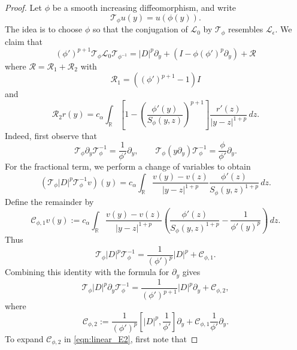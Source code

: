 \documentclass[11pt]{amsart}
\theoremstyle{definition}
\theoremstyle{remark}
\numberwithin{equation}{section}
\newcommand{\R}{\mathbb{R}}
\newcommand{\mc}[1]{\mathcal{#1}}
\begin{document}
\begin{proof}
    Let $\phi$ be a smooth increasing diffeomorphism, and write
    \[
        \mc{T}_\phi u(y)=u(\phi(y)).
    \]
    The idea is to choose $\phi$ so that the conjugation of $\mc{L}_0$ by $\mc{T}_\phi$ resembles $\mc{L}_\epsilon$. We claim that 
    \begin{equation}\label{eqn:linear_conjugation}
        (\phi')^{p + 1}\mc{T}_\phi \mc{L}_0 \mc{T}_{\phi^{-1}} = |D|^p \partial_y + \left(I - \phi(\phi')^p\partial_y\right) + \mc{R}
    \end{equation}
    where $\mc{R} = \mc{R}_1 + \mc{R}_2$ with 
    \begin{equation}\label{eqn:linear_R1}
        \mc{R}_1 = \left((\phi')^{p + 1} - 1\right)I
    \end{equation}
    and
    \begin{equation}\label{eqn:linear_R2}
        \mc{R}_2r(y) = c_\alpha\int_{\R}
        \left[1-\left(\frac{\phi'(y)}{S_\phi(y,z)}\right)^{p+1}\right]
        \frac{r'(z)}{|y-z|^{1+p}}\,dz.
    \end{equation}
    Indeed, first observe that
    \[
        \mc{T}_\phi\partial_y\mc{T}_\phi^{-1}
        = \frac{1}{\phi'}\partial_y,
        \qquad
        \mc{T}_\phi(y\partial_y)\mc{T}_\phi^{-1}
        =\frac{\phi}{\phi'}\partial_y.
    \]
    For the fractional term, we perform a change of variables to obtain
    \[
        (\mc{T}_\phi|D|^p\mc{T}_\phi^{-1}v)(y)
        =c_\alpha\int_{\R}\frac{v(y)-v(z)}{|y-z|^{1+p}}
        \frac{\phi'(z)}{S_\phi(y,z)^{1+p}}\,dz.
    \]
    Define the remainder by
    \begin{equation}\label{eqn:linear_E1}
        \mc{C}_{\phi,1}v(y)
        :=c_\alpha\int_{\R}\frac{v(y)-v(z)}{|y-z|^{1+p}}
        \left(\frac{\phi'(z)}{S_\phi(y,z)^{1+p}}
        -\frac{1}{\phi'(y)^p}\right)\,dz.
    \end{equation}
    Thus
    \[
        \mc{T}_\phi|D|^p\mc{T}_\phi^{-1}
        =\frac{1}{(\phi')^p}|D|^p+\mc{C}_{\phi,1}.
    \]
    Combining this identity with the formula for $\partial_y$ gives
    \[
        \mc{T}_\phi|D|^p\partial_y\mc{T}_\phi^{-1}
        =\frac{1}{(\phi')^{p+1}}|D|^p\partial_y+\mc{C}_{\phi,2},
    \]
    where
    \begin{equation}\label{eqn:linear_E2}
        \mc{C}_{\phi,2}
        :=\frac{1}{(\phi')^p}
        [|D|^p,\frac{1}{\phi'}]\partial_y
        +\mc{C}_{\phi,1}\frac{1}{\phi'}\partial_y.
    \end{equation}
    To expand $\mc{C}_{\phi,2}$ in \eqref{eqn:linear_E2}, first note that

\end{proof}
\end{document}
